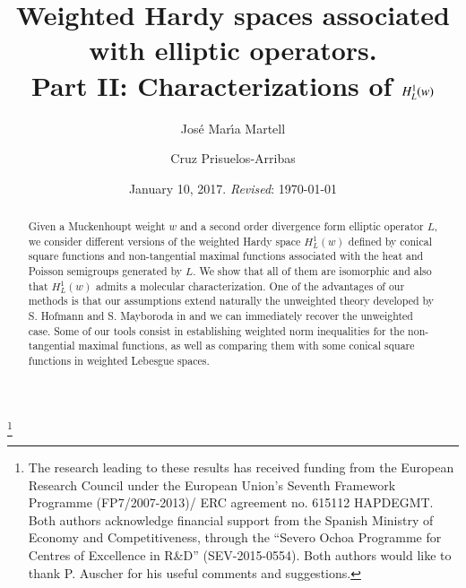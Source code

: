 \documentclass[11pt, a4paper,leqno]{amsart}
\theoremstyle{plain}
\theoremstyle{definition}
\theoremstyle{remark}
\numberwithin{equation}{section}
\begin{document}
\allowdisplaybreaks
\author{Jos\'e Mar{\'\i}a Martell}
\address{Jos\'e Mar{\'\i}a Martell
\\
Instituto de Ciencias Matem\'aticas CSIC-UAM-UC3M-UCM
\\
Consejo Superior de Investigaciones Cient{\'\i}ficas
\\
C/ Nicol\'as Cabrera, 13-15
\\
E-28049 Madrid, Spain} 

\title[Weighted Hardy spaces associated with elliptic operators]{Weighted Hardy spaces associated with elliptic operators.
\\[0.3cm]
{\small Part II: Characterizations of $H^1_L(\lowercase{w})$}}

\author{Cruz Prisuelos-Arribas}

\address{Cruz Prisuelos-Arribas
Instituto de Ciencias Matem\'aticas, CSIC-UAM-UC3M-UCM
\\
Consejo Superior de Investigaciones Cient{\'\i}ficas
\\
C/ Nicol\'as Cabrera, 13-15
\\
E-28049 Madrid, Spain} 






\thanks{The research leading to these results has received funding from the European Research
Council under the European Union's Seventh Framework Programme (FP7/2007-2013)/ ERC
agreement no. 615112 HAPDEGMT.
Both authors  acknowledge financial support from the Spanish Ministry of Economy and Competitiveness, through the ``Severo Ochoa Programme for Centres of Excellence in R\&D'' (SEV-2015-0554). Both authors would like to thank P. Auscher for his useful comments and suggestions. 
}



\date{ January 10, 2017. \textit{Revised}: \today}



\begin{abstract}
Given a Muckenhoupt weight $w$ and a second order divergence form elliptic operator $L$, we consider different versions of the weighted Hardy space $H^1_L(w)$ defined by 
conical square functions and non-tangential maximal functions associated with the heat and Poisson semigroups generated by $L$. We show that all of them are isomorphic and also that $H^1_L(w)$ admits a molecular characterization.  One of the advantages of our methods is that our assumptions extend naturally the unweighted theory developed by 
S. Hofmann and S. Mayboroda in \cite{HofmannMayboroda} and we can immediately recover the unweighted case.  Some of our tools consist in establishing weighted norm inequalities for the non-tangential maximal functions, as well as comparing them with some conical square functions in weighted Lebesgue spaces. 
\end{abstract}
\end{document}
